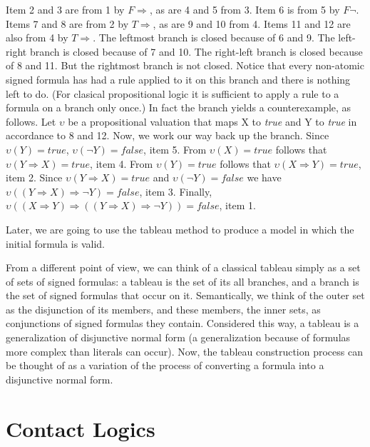 \documentclass{article}
\begin{document}
	Item 2 and 3 are from 1 by $F \Rightarrow$, as are 4 and 5 from 3. Item 6 is from 5 by $F \neg$. Items 7 and 8 are from 2 by $T \Rightarrow$, as are 9 and 10 from 4. Items 11 and 12 are also from 4 by $T \Rightarrow$. The leftmost branch is closed because of 6 and 9. The left-right branch is closed because of 7 and 10. The right-left branch is closed because of 8 and 11. But the rightmost branch is not closed. Notice that every non-atomic signed formula has had a rule applied to it on this branch and there is nothing left to do. (For clasical propositional logic it is sufficient to apply a rule to a formula on a branch only once.) In fact the branch yields a counterexample, as follows. Let $\upsilon$ be a propositional valuation that maps X to \textit{true} and Y to \textit{true} in accordance to 8 and 12. Now, we work our way back up the branch. Since $\upsilon(Y) = true$, $\upsilon(\neg Y) = false$, item 5. From $\upsilon(X) = true$ follows that $\upsilon(Y \Rightarrow X) = true$, item 4. From $\upsilon(Y) = true$ follows that $\upsilon(X \Rightarrow Y) = true$, item 2. Since $\upsilon(Y \Rightarrow X) = true$ and $\upsilon(\neg Y) = false$ we have $\upsilon((Y \Rightarrow X) \Rightarrow \neg Y) = false$, item 3. Finally, $\upsilon((X \Rightarrow Y) \Rightarrow ((Y \Rightarrow X) \Rightarrow \neg Y)) = false$, item 1.
	\par
	Later, we are going to use the tableau method to produce a model in which the initial formula is valid.
	\par
	From a different point of view, we can think of a classical tableau simply as a set of sets of signed formulas: a tableau is the set of its all branches, and a branch is the set of signed formulas that occur on it. Semantically, we think of the outer set as the disjunction of its members, and these members, the inner sets, as conjunctions of signed formulas they contain. Considered this way, a tableau is a generalization of disjunctive normal form (a generalization because of formulas more complex than literals can occur). Now, the tableau construction process can be thought of as a variation of the process of converting a formula into a disjunctive normal form. 	

	\newpage
	\section{Contact Logics}
\end{document}
